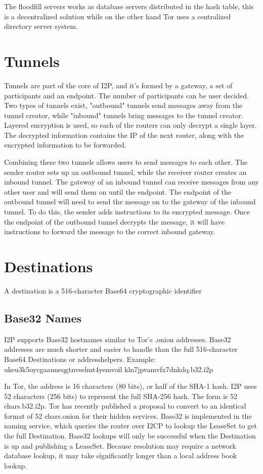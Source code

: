 \documentclass[a4paper,twocolumn,12pt]{article}
\begin{document}
The floodfill servers works as database servers distributed in the hash table,
this is a decentralized solution while on the other hand Tor\cite{tor-design}
uses a centralized directory server system.

\section{Tunnels}

Tunnels are part of the core of I2P, and it's formed by a gateway, a set of
participants and an endpoint. The number of participants can be user decided.
Two types of tunnels exist, "outbound" tunnels send messages away from the
tunnel creator, while "inbound" tunnels bring messages to the tunnel creator.
Layered encryption is used, so each of the routers can only decrypt a single
layer. The decrypted information contains the IP of the next router, along with
the encrypted information to be forwarded.

Combining these two tunnels allows users to send messages to each other. The
sender router sets up an outbound tunnel, while the receiver router creates an
inbound tunnel. The gateway of an inbound tunnel can receive messages from any
other user and will send them on until the endpoint. The endpoint of the
outbound tunnel will need to send the message on to the gateway of the inbound
tunnel. To do this, the sender adds instructions to its encrypted message. Once
the endpoint of the outbound tunnel decrypts the message, it will have
instructions to forward the message to the correct inbound gateway.

\section{Destinations}

A destination is a 516-character Base64 cryptographic identifier

\subsection{Base32 Names}

I2P supports Base32 hostnames similar to Tor's\cite{tor-design} .onion
addresses. Base32 addresses are much shorter and easier to handle than the full
516-character Base64 Destinations or addresshelpers. Example:
ukeu3k5oycgaauneqgtnvselmt4yemvoil
kln7jpvamvfx7dnkdq.b32.i2p

In Tor\cite{tor-design}, the address is 16 characters (80 bits), or half of the
SHA-1 hash.  \cite{tor-hiddenservice} I2P uses 52 characters (256 bits) to
represent the full SHA-256 hash. The form is {52 chars}.b32.i2p.
Tor\cite{tor-design} has recently published a proposal to convert to an
identical format of {52 chars}.onion for their hidden services. Base32 is
implemented in the naming service, which queries the router over I2CP to lookup
the LeaseSet to get the full Destination. Base32 lookups will only be
successful when the Destination is up and publishing a LeaseSet. Because
resolution may require a network database lookup, it may take significantly
longer than a local address book lookup.
\end{document}
